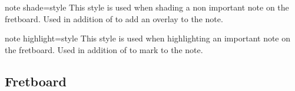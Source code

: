 \documentclass[a4paper]{article}
\begin{document}
\begin{docKey}[tikz][]{note shade}{=style}{}
  This style is used when shading a non important note on the
  fretboard. Used in addition of  to add an overlay to
  the note.
\end{docKey}

\begin{docKey}[tikz][]{note highlight}{=style}{}
  This style is used when highlighting an important note on the
  fretboard. Used in addition of  to mark to
  the note.
\end{docKey}


\subsection{Fretboard}
\end{document}
